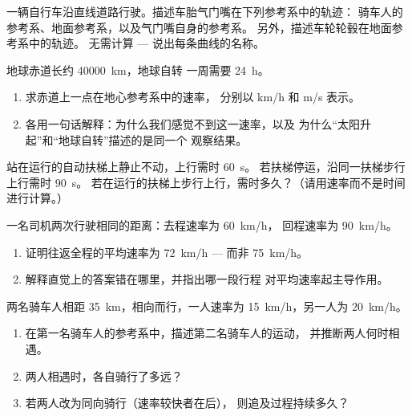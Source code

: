 \begin{exercise}[$\star\star$]\label{exo:g10:relative-motion:9}
一辆自行车沿直线道路行驶。描述车胎气门嘴在下列参考系中的轨迹：
骑车人的参考系、地面参考系，以及气门嘴自身的参考系。
另外，描述车轮轮毂在地面参考系中的轨迹。
无需计算 --- 说出每条曲线的名称。
\end{exercise}

\begin{exercise}[$\star\star$]\label{exo:g10:relative-motion:10}
地球赤道长约 \qty{40000}{km}，地球自转
一周需要 \qty{24}{h}。
\begin{enumerate}
  \item 求赤道上一点在地心参考系中的速率，
        分别以 \unit{km/h} 和 \unit{m/s} 表示。
  \item 各用一句话解释：为什么我们感觉不到这一速率，以及
        为什么“太阳升起”和“地球自转”描述的是同一个
        观察结果。
\end{enumerate}
\end{exercise}

\begin{exercise}[$\star\star$]\label{exo:g10:relative-motion:11}
站在运行的自动扶梯上静止不动，上行需时 \qty{60}{s}。
若扶梯停运，沿同一扶梯步行上行需时 \qty{90}{s}。
若在运行的扶梯上步行上行，需时多久？（请用速率而不是时间
进行计算。）
\end{exercise}

\begin{exercise}[$\star\star\star$]\label{exo:g10:relative-motion:12}
一名司机两次行驶相同的距离：去程速率为 \qty{60}{km/h}，
回程速率为 \qty{90}{km/h}。
\begin{enumerate}
  \item 证明往返全程的平均速率为
        \qty{72}{km/h} --- 而非 \qty{75}{km/h}。
  \item 解释直觉上的答案错在哪里，并指出哪一段行程
        对平均速率起主导作用。
\end{enumerate}
\end{exercise}

\begin{exercise}[$\star\star\star$]\label{exo:g10:relative-motion:13}
两名骑车人相距 \qty{35}{km}，相向而行，一人速率为
\qty{15}{km/h}，另一人为 \qty{20}{km/h}。
\begin{enumerate}
  \item 在第一名骑车人的参考系中，描述第二名骑车人的运动，
        并推断两人何时相遇。
  \item 两人相遇时，各自骑行了多远？
  \item 若两人改为同向骑行（速率较快者在后），
        则追及过程持续多久？
\end{enumerate}
\end{exercise}


